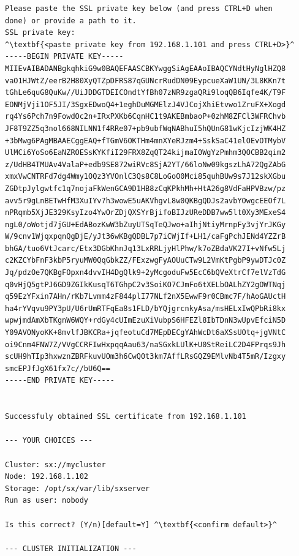 \begin{lstlisting}
Please paste the SSL private key below (and press CTRL+D when
done) or provide a path to it.
SSL private key:
^\textbf{<paste private key from 192.168.1.101 and press CTRL+D>}^
-----BEGIN PRIVATE KEY-----
MIIEvAIBADANBgkqhkiG9w0BAQEFAASCBKYwggSiAgEAAoIBAQCYNdtHyNglHZQ8
vaO1HJWtZ/eerB2H80XyQTZpDFRS87qGUNcrRudDN09EypcueXaW1UN/3L8KKn7t
tGhLe6quG8QuKw//UiJDDGTDEICOndtYfBh07zNR9zgaQRi9loqQB6Iqfe4K/T9F
EONMjVji1OF5JI/3SgxEDwoQ4+1eghDuMGMElzJ4VJCojXhiEtvwo1ZruFX+Xogd
rq4Ys6Pch7n9FowdOc2n+IRxPXKb6CqnHC1t9AKEBmbaoP+0zhM8ZFCl3WFRChvb
JF8T9ZZ5q3nol668NILNN1f4RRe07+pb9ubfWqNABhuI5hQUnG81wKjcIzjWK4HZ
+3bMwg6PAgMBAAECggEAQ+fTGmV6OKTHm4mnXYeRJzm4+SskSaC41elOEvOTMybV
UlMCi6YoSo6EaNZROESsKYKfiI29FRX8ZqQT24kijmaI0WgYzPmhm3QOCBB2qim2
z/UdHB4TMUAv4ValaP+edb9SE872wiRVc8SjA2YT/66loNw09kgszLhA72QgZAbG
xmxVwCNTRFd7dg4Wmy1OQz3YVOnlC3Qs8C8LoGoO0Mci85quhBUw9s7J12skXGbu
ZGDtpJylgwtfc1q7nojaFkWenGCA9D1HB8zCqKPkhMh+HtA26g8VdFaHPVBzw/pz
avv5r9gLnBETwHfM3XuIYv7h3wowE5uAKVhgvL8w0QKBgQDJs2avbYOwgcEEOf7L
nPRqmb5XjJE329KsyIzo4YwOrZDjQXSYrBjifoBIJzUReDDB7ww5lt0Xy3MExeS4
ngL0/oWotjd7jGU+EdABozKwW3bZuyUTSqTeQJwo+aIhjNtiyMrnpFy3vjYrJKGy
W/9cnv1WjqxpqnQgDjE/yJt36wKBgQDBL7p7iCWjIf+LH1/caFgPchJENd4YZZrB
bhGA/tuo6VtJcarc/Etx3DGbKhnJq13LxRRLjyHlPhw/k7oZBdaVK27I+vNfw5Lj
c2KZCYbFnF3kbP5ryuMW0QqGbkZZ/FExzwgFyAOUuCTw9L2VmKtPgbP9ywDTJc0Z
Jq/pdzOe7QKBgFOpxn4dvvIH4DgQlk9+2yMcgoduFw5EcC6bQVeXtrCf7elVzTdG
q0vHjQ5gtPJ6GD9ZGIkKusqT6TGhpC2v3SoiKO7CJmFo6tXELbOALhZY2gOWTNqj
q59EzYFxin7AHn/rKb7Lvmm4zF844plI77NLf2nX5EwwF9r0CBmc7F/hAoGAUctH
ha4rYVqvu9PY3pU/U6rUmRTFqEa8s1FLD/bYQjgrcnkyAsa/msHELxIwQPbRi8kx
wpwjmdAmXbTKgnW6WQY+rdGy4cUImEzuXiVubpS6HFEZl8IbTDnN3wUpvEfciN5D
Y09AVONyoKK+8mvlfJBKCRa+jqfeotuCd7MEpDECgYAhWcDt6aXSsUOtq+jgVNtC
oi9Cnm4FNW7Z/VVgCCRFIwHxpqqAau63/naSGxkLUlK+U0StReiLC2D4FPrqs9Jh
scUH9hTIp3hxwznZBRFkuvUOm3h6CwQ0t3km7AffLRsGQZ9EMlvNb4T5mR/Izgxy
smcEPJfJgX61fx7c//bU6Q==
-----END PRIVATE KEY-----


Successfuly obtained SSL certificate from 192.168.1.101

--- YOUR CHOICES ---

Cluster: sx://mycluster
Node: 192.168.1.102
Storage: /opt/sx/var/lib/sxserver
Run as user: nobody

Is this correct? (Y/n)[default=Y] ^\textbf{<confirm default>}^

--- CLUSTER INITIALIZATION ---


\end{lstlisting}

